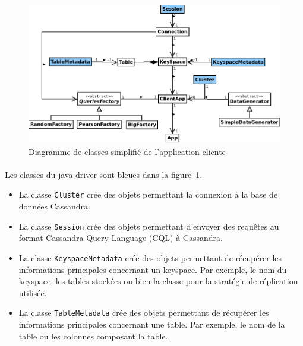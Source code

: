 \documentclass[12pt]{article}
\newcommand{\class}[1]{\texttt{#1}}
\begin{document}
\begin{figure}[h]
	\centering
		\includegraphics[width=12cm]{images/client/diagumlclient.png}
	\caption{Diagramme de classes simplifié de l'application cliente \label{fig:client_uml}}
\end{figure}

\paragraph{} 

\paragraph{} Les classes du java-driver sont bleues dans la figure~\ref{fig:client_uml}.
\begin{itemize}
 \item La classe \class{Cluster} crée des objets permettant la connexion à la base de données Cassandra.
 \item La classe \class{Session} crée des objets permettant d'envoyer des requêtes au format Cassandra Query Language (CQL) à Cassandra. 
 \item La classe \class{KeyspaceMetadata} crée des objets permettant de récupérer les informations principales concernant un keyspace.
 Par exemple, le nom du keyspace, les tables stockées ou bien la classe pour la stratégie de réplication utilisée.
 \item La classe \class{TableMetadata} crée des objets permettant de récupérer les informations principales concernant une table.
 Par exemple, le nom de la table ou les colonnes composant la table.
\end{itemize}
\end{document}
